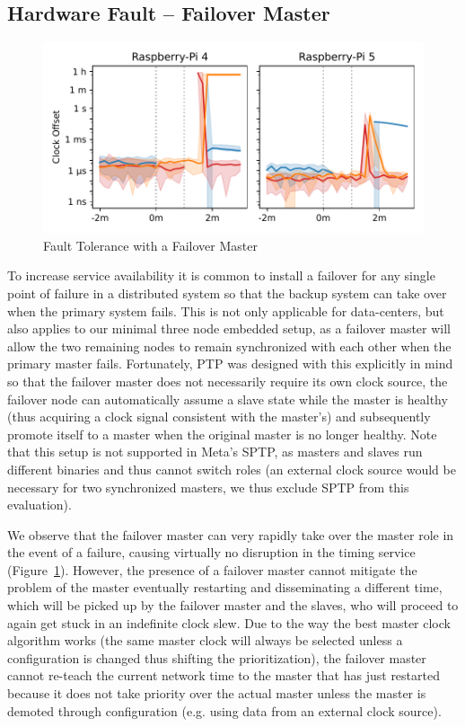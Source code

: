 \subsection{Hardware Fault -- Failover Master}

\begin{figure}
    \includegraphics[width=\linewidth]{res/generated/fault/hardware/master_failover_cluster_comparison.pdf}
    \caption{Fault Tolerance with a Failover Master}
    \label{fig:failover}
\end{figure}

To increase service availability it is common to install a failover for any single point of failure in a distributed system so that the backup system can take over when the primary system fails. This is not only applicable for data-centers, but also applies to our minimal three node embedded setup, as a failover master will allow the two remaining nodes to remain synchronized with each other when the primary master fails. Fortunately, PTP was designed with this explicitly in mind so that the failover master does not necessarily require its own clock source, the failover node can automatically assume a slave state while the master is healthy (thus acquiring a clock signal consistent with the master's) and subsequently promote itself to a master when the original master is no longer healthy. Note that this setup is not supported in Meta's SPTP, as masters and slaves run different binaries and thus cannot switch roles (an external clock source would be necessary for two synchronized masters, we thus exclude SPTP from this evaluation).

We observe that the failover master can very rapidly take over the master role in the event of a failure, causing virtually no disruption in the timing service (Figure~\ref{fig:failover}). However, the presence of a failover master cannot mitigate the problem of the master eventually restarting and disseminating a different time, which will be picked up by the failover master and the slaves, who will proceed to again get stuck in an indefinite clock slew. Due to the way the best master clock algorithm works (the same master clock will always be selected unless a configuration is changed thus shifting the prioritization), the failover master cannot re-teach the current network time to the master that has just restarted because it does not take priority over the actual master unless the master is demoted through configuration (e.g. using data from an external clock source).

